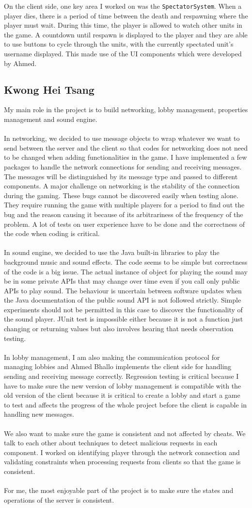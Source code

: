 \documentclass[12pt]{article}
\newcommand{\return}{\\\\\noindent}
\begin{document}
On the client side, one key area I worked on was the \texttt{SpectatorSystem}. When a player dies, there is a period of time between the death and respawning where the player must wait. During this time, the player is allowed to watch other units in the game. A countdown until respawn is displayed to the player and they are able to use buttons to cycle through the units, with the currently spectated unit's username displayed. This made use of the UI components which were developed by Ahmed.
\newpage
\subsection{Kwong Hei Tsang}
My main role in the project is to build networking, lobby management, properties management and sound engine.\return
In networking, we decided to use message objects to wrap whatever we want to send between the server and the client so that codes for networking does not need to be changed when adding functionalities in the game. I have implemented a few packages to handle the network connections for sending and receiving messages. The messages will be distinguished by its message type and passed to different components. A major challenge on networking is the stability of the connection during the gaming. These bugs cannot be discovered easily when testing alone. They require running the game with multiple players for a period to find out the bug and the reason causing it because of its arbitrariness of the frequency of the problem. A lot of tests on user experience have to be done and the correctness of the code when coding is critical.\return
In sound engine, we decided to use the Java built-in libraries to play the background music and sound effects. The code seems to be simple but correctness of the code is a big issue. The actual instance of object for playing the sound may be in some private APIs that may change over time even if you call only public APIs to play sound. The behaviour is uncertain between software updates when the Java documentation of the public sound API is not followed strictly. Simple experiments should not be permitted in this case to discover the functionality of the sound player. JUnit test is impossible either because it is not a function just changing or returning values but also involves hearing that needs observation testing.\return
In lobby management, I am also making the communication protocol for managing lobbies and Ahmed Bhallo implements the client side for handling sending and receiving message correctly. Regression testing is critical because I have to make sure the new version of lobby management is compatible with the old version of the client because it is critical to create a lobby and start a game to test and affects the progress of the whole project before the client is capable in handling new messages.\return
We also want to make sure the game is consistent and not affected by cheats. We talk to each other about techniques to detect malicious requests in each component. I worked on identifying player through the network connection and validating constraints when processing requests from clients so that the game is consistent. \return 
For me, the most enjoyable part of the project is to make sure the states and operations of the server is consistent.\return
\newpage
\end{document}
